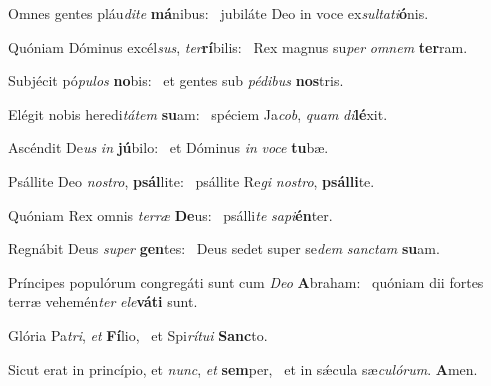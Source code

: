 \item Omnes gentes pláu\textit{dite} \textbf{má}nibus:~\psstar{} jubiláte Deo in voce ex\textit{sultati}\textbf{ó}nis.
\item Quóniam Dóminus excél\textit{sus}, \textit{ter}\textbf{rí}bilis:~\psstar{} Rex magnus su\textit{per} \textit{omnem} \textbf{ter}ram.
\item Subjécit pó\textit{pulos} \textbf{no}bis:~\psstar{} et gentes sub \textit{pédibus} \textbf{nos}tris.
\item Elégit nobis heredi\textit{tátem} \textbf{su}am:~\psstar{} spéciem Ja\textit{cob}, \textit{quam} \textit{di}\textbf{lé}xit.
\item Ascéndit De\textit{us} \textit{in} \textbf{jú}bilo:~\psstar{} et Dóminus \textit{in} \textit{voce} \textbf{tu}bæ.
\item Psállite Deo \textit{nostro}, \textbf{psál}lite:~\psstar{} psállite Re\textit{gi} \textit{nostro}, \textbf{psál}\textbf{li}te.
\item Quóniam Rex omnis \textit{terræ} \textbf{De}us:~\psstar{} psálli\textit{te} \textit{sapi}\textbf{én}ter.
\item Regnábit Deus \textit{super} \textbf{gen}tes:~\psstar{} Deus sedet super se\textit{dem} \textit{sanctam} \textbf{su}am.
\item Príncipes populórum congre\-gáti sunt cum \textit{Deo} \textbf{A}braham:~\psstar{} quóniam dii fortes terræ vehemén\textit{ter} \textit{ele}\textbf{vá}\textbf{ti} sunt.
\item Glória Pa\textit{tri}, \textit{et} \textbf{Fí}lio,~\psstar{} et Spi\textit{rítui} \textbf{Sanc}to.
\item Sicut erat in princípio, et \textit{nunc}, \textit{et} \textbf{sem}per,~\psstar{} et in sǽcula sæ\textit{culórum}. \textbf{A}men.

